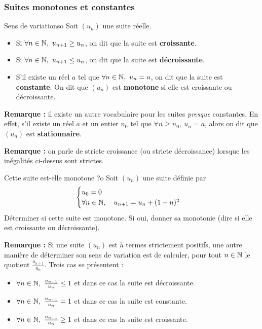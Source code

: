 \subsubsection{Suites monotones et constantes}

\begin{definition}{Sens de variations}{o}
	Soit $(u_n)$ une suite réelle. 
	\begin{itemize}
		\item Si $\forall n\in\mathbb{N},\ u_{n+1}\geq u_n$, on dit que la suite est \textbf{croissante}.
		\item Si $\forall n\in\mathbb{N},\ u_{n+1}\leq u_n$, on dit que la suite est \textbf{décroissante}.
		\item S'il existe un réel $a$ tel que $\forall n\in\mathbb{N},\ u_n=a$, on dit que la suite est \textbf{constante}.
		On dit que $(u_n)$ est \textbf{monotone} si elle est croissante ou décroissante.  
	\end{itemize}
\end{definition}
\textbf{Remarque :} il existe un autre vocabulaire pour les suites \textit{presque} constantes. En effet, s'il existe un réel $a$ et un entier $n_0$ tel que $\forall n\geq n_0,\ u_n=a$, alors on dit que $(u_n)$ est \textbf{stationnaire}.


\textbf{Remarque :} on parle de stricte croissance (ou stricte décroissance) lorsque les inégalités ci-dessus sont strictes.
\begin{exemple}{Cette suite est-elle monotone ?}{o}
	Soit $(u_n)$ une suite définie par \[\begin{cases} u_0=0\\\forall n\in\mathbb{N},\quad u_{n+1}=u_n+(1-n)^2\end{cases}\]
	Déterminer si cette suite est monotone. Si oui, donner sa monotonie (dire si elle est croissante ou décroissante).
\end{exemple}

\textbf{Remarque : } Si une suite $(u_n)$ est à termes strictement positifs, une autre manière de déterminer son sens de variation est de calculer, pour tout $n\in\mathbb{N}$ le quotient $\frac{u_{n+1}}{u_n}$. Trois cas se présentent :

\begin{itemize}
	\item $\forall n\in\mathbb{N},\ \frac{u_{n+1}}{u_n} \leq 1$ et dans ce cas la suite est décroissante.
	\item $\forall n\in\mathbb{N},\ \frac{u_{n+1}}{u_n} = 1$ et dans ce cas la suite est constante.
	\item $\forall n\in\mathbb{N},\ \frac{u_{n+1}}{u_n} \geq 1$ et dans ce cas la suite est croissante.
\end{itemize}

